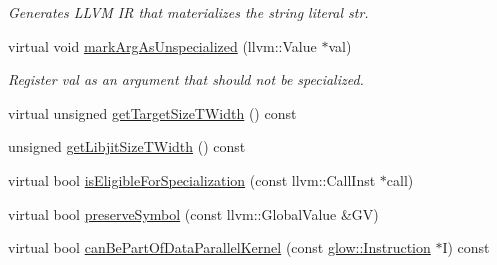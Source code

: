 \begin{DoxyCompactItemize}
\begin{DoxyCompactList}\small\item\em Generates L\+L\+VM IR that materializes the string literal {\ttfamily str}. \end{DoxyCompactList}\item 
\mbox{\label{classglow_1_1_l_l_v_m_i_r_gen_affd37d8ea2cc36dec91b7dfd9d3783fe}} 
virtual void \hyperlink{classglow_1_1_l_l_v_m_i_r_gen_affd37d8ea2cc36dec91b7dfd9d3783fe}{mark\+Arg\+As\+Unspecialized} (llvm\+::\+Value $\ast$val)
\begin{DoxyCompactList}\small\item\em Register {\ttfamily val} as an argument that should not be specialized. \end{DoxyCompactList}\item 
virtual unsigned \hyperlink{classglow_1_1_l_l_v_m_i_r_gen_a6dd22a5eea9925c89897a8a24b747dec}{get\+Target\+Size\+T\+Width} () const
\item 
unsigned \hyperlink{classglow_1_1_l_l_v_m_i_r_gen_aa6c45ee294639713b1eaefe4092576e2}{get\+Libjit\+Size\+T\+Width} () const
\item 
virtual bool \hyperlink{classglow_1_1_l_l_v_m_i_r_gen_a6d4377d61d03f0de9c285cf9b0448e8b}{is\+Eligible\+For\+Specialization} (const llvm\+::\+Call\+Inst $\ast$call)
\item 
virtual bool \hyperlink{classglow_1_1_l_l_v_m_i_r_gen_a1d5884c76fb5620ed1955a9846bf9b82}{preserve\+Symbol} (const llvm\+::\+Global\+Value \&GV)
\item 
virtual bool \hyperlink{classglow_1_1_l_l_v_m_i_r_gen_a7b41c0403ef1ff77626f35c5d4590118}{can\+Be\+Part\+Of\+Data\+Parallel\+Kernel} (const \hyperlink{classglow_1_1_instruction}{glow\+::\+Instruction} $\ast$I) const
\end{DoxyCompactItemize}
